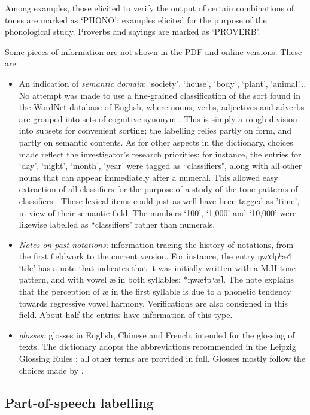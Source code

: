 \documentclass[oldfontcommands,oneside,a4paper,11pt]{article}
\newcommand{\ipa}[1]{{\phon #1}} %
\begin{document}
	Among examples, those elicited to verify the output of certain combinations of tones are marked as ‘PHONO': examples elicited for the purpose of the phonological study. Proverbs and sayings are marked as ‘PROVERB'.
	
	Some pieces of information are not shown in the PDF and online versions. These are:
	\begin{itemize}
		\item An indication of \textit{semantic domain}: ‘society', ‘house', ‘body', ‘plant', ‘animal'... No attempt was made to use a fine-grained classification of the sort found in the WordNet database of English, where nouns, verbs, adjectives and adverbs are grouped into sets of cognitive synonym \citep{Fellbaum 2005}. This is simply a rough division into subsets for convenient sorting; the labelling relies partly on form, and partly on semantic contents. As for other aspects in the dictionary, choices made reflect the investigator's research priorities: for instance, the entries for ‘day’, ‘night’, ‘month’, ‘year’ were tagged as “classifiers", along with all other nouns that can appear immediately after a numeral. This allowed easy extraction of all classifiers for the purpose of a study of the tone patterns of classifiers \citep{Michaud2013}. These lexical items could just as well have been tagged as 'time', in view of their semantic field. The numbers ‘100’, ‘1,000’ and ‘10,000’ were likewise labelled as “classifiers" rather than numerals.
		\item \textit{Notes on past notations:} information tracing the history of notations, from the first fieldwork to the current version. For instance, the entry \ipa{ŋwɤ˧pʰæ˧˥} ‘tile' has a note that indicates that it was initially written with a M.H tone pattern, and with vowel \ipa{æ} in both syllables: *\ipa{ŋwæ˧pʰæ˥}. The note explains that the perception of \ipa{æ} in the first syllable is due to a phonetic tendency towards regressive vowel harmony. Verifications are also consigned in this field. About half the entries have information of this type.
		\item \textit{glosses:} glosses in English, Chinese and French, intended for the glossing of texts. The dictionary adopts the abbreviations recommended in the Leipzig Glossing Rules \citep{Comrie}; all other terms are provided in full. Glosses mostly follow the choices made by \citep{Lidz2010}.
	\end{itemize}
	
	\subsection{Part-of-speech labelling} \label{sec:pos}
	
\end{document}
